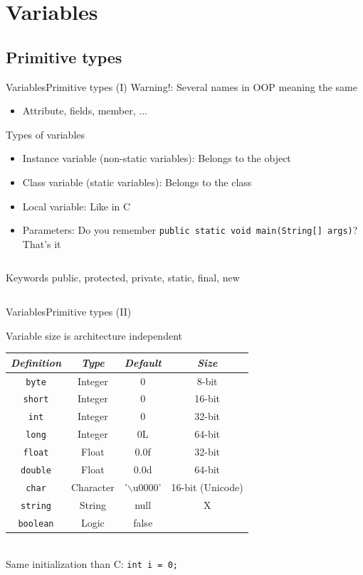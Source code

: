 \documentclass[10pt,compress]{beamer} %
\begin{document}
\section{Variables}
\subsection{Primitive types}
\begin{frame}{Variables}{Primitive types (I)}
	Warning!: Several names in OOP meaning the same
		\begin{itemize}
		    \item Attribute, fields, member, ...
		\end{itemize}
	Types of variables
		\begin{itemize}
			\item Instance variable (non-static variables): Belongs to the object
			\item Class variable (static variables): Belongs to the class
			\item Local variable: Like in C
			\item Parameters: Do you remember \texttt{public static void main(String[] args)}? That's it
		\end{itemize}

    \begin{columns}
			\begin{block}{Keywords}
				public, protected, private, static, final, new
			\end{block}
	\end{columns}
	\bigskip
\end{frame}

\begin{frame}{Variables}{Primitive types (II)}

\centering Variable size is architecture independent
\bigskip
\centering \small{
	\begin{tabular}{cccc} \hline
	\textit{Definition} 	& \textit{Type}		& \textit{Default} 	& \textit{Size} \\\hline
\texttt{byte} 	& Integer	& 0			& 8-bit		\\
\texttt{short} 	& Integer	& 0			& 16-bit 	\\
\texttt{int} 	& Integer	& 0			& 32-bit	\\
\texttt{long} 	& Integer	& 0L		& 64-bit	\\
\texttt{float} 	& Float		& 0.0f		& 32-bit	\\
\texttt{double} & Float		& 0.0d		& 64-bit	\\
\texttt{char} 	& Character	& '$\backslash$u0000'	& 16-bit (Unicode)\\
\texttt{string} & String	& null		& X			\\
\texttt{boolean} & Logic		& false		& 			\\
\hline
\end{tabular}
}
\\
\bigskip
    Same initialization than C: \texttt{int i = 0;}
\end{frame}
\end{document}
